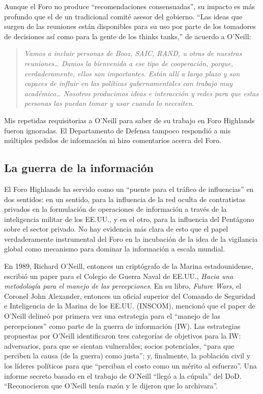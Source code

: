 \documentclass[10pt,a5paper,twoside,spanish,]{book}
\begin{document}
Aunque el Foro no produce ``recomendaciones consensuadas'', su impacto
es más profundo que el de un tradicional comité asesor del gobierno.
``Las ideas que surgen de las reuniones están disponibles para su uso
por parte de los tomadores de decisiones así como para la gente de los
thinks tanks,'' de acuerdo a O'Neill:

\begin{quote}
\emph{Vamos a incluir personas de Booz, SAIC, RAND, u otras de nuestras
reuniones\ldots{} Damos la bienvenida a ese tipo de cooperación, porque,
verdaderamente, ellos son importantes. Están allí a largo plazo y son
capaces de influir en las políticas gubernamentales con trabajo muy
académico\ldots{} Nosotros producimos ideas e interacción y redes para
que estas personas las puedan tomar y usar cuando lo necesiten.}
\end{quote}

Mis repetidas requisitorias a O'Neill para saber de su trabajo en Foro
Highlands fueron ignoradas. El Departamento de Defensa tampoco respondió
a mis múltiples pedidos de información ni hizo comentarios acerca del
Foro.

\subsection{La guerra de la
información}\label{la-guerra-de-la-informaciuxf3n}

El Foro Highlands ha servido como un ``puente para el tráfico de
influencias'' en dos sentidos: en un sentido, para la influencia de la
red oculta de contratistas privados en la formulación de operaciones de
información a través de la inteligencia militar de los EE.UU., y en el
otro, para la influencia del Pentágono sobre el sector privado. No hay
evidencia más clara de esto que el papel verdaderamente instrumental del
Foro en la incubación de la idea de la vigilancia global como mecanismo
para dominar la información a escala mundial.

En 1989, Richard O'Neill, entonces un criptógrafo de la Marina
estadounidense, escribió un paper para el Colegio de Guerra Naval de
EE.UU., \emph{Hacia una metodología para el manejo de las percepciones}.
En su libro, \emph{Future Wars}, el Coronel John Alexander, entonces un
oficial superior del Comando de Seguridad e Inteligencia de la Marina de
los EE.UU. (INSCOM), mencionó que el paper de O'Neill delineó por
primera vez una estrategia para el ``manejo de las percepciones'' como
parte de la guerra de información (IW). Las estrategias propuestas por
O'Neill identificaron tres categorías de objetivos para la IW:
adversarios, para que se sientan vulnerables; socios potenciales, ``para
que perciben la causa (de la guerra) como justa''; y, finalmente, la
población civil y los líderes políticos para que ``perciban el costo
como un mérito al esfuerzo''. Una informe secreto basado en el trabajo
de O'Neill ``llegó a la cúpula'' del DoD. ``Reconocieron que O'Neill
tenía razón y le dijeron que lo archivara''.
\end{document}
